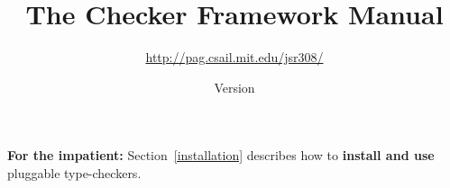 \documentclass[10pt]{article}
\title{The Checker Framework Manual}
\author{%
\url{http://pag.csail.mit.edu/jsr308/}}
\date{Version \ReleaseInfo{}}
\def\codesize{\relax}           %
\newcommand{\code}[1]{\ifmmode{\mbox{\codesize\ttfamily{#1}}}\else{\codesize\ttfamily #1}\fi}
\def\<#1>{\code{#1}}
\newcommand{\htmlhr}{\relax}
\begin{document}
\maketitle


  \let\Itemize =\itemize
  \let\Enumerate =\enumerate
  \let\Description =\description
  \def\Nospacing{\itemsep=0pt\topsep=0pt\partopsep=0pt\parskip=0pt\parsep=0pt}
  \renewenvironment{itemize}{\Itemize\Nospacing}{\endlist}
  \renewenvironment{enumerate}{\Enumerate\Nospacing}{\endlist}
  \renewenvironment{description}{\Description\Nospacing}{\endlist}

  \makeatletter
  \def\topfigrule{\kern3\p@ \hrule \kern -3.4\p@} %
  \def\botfigrule{\kern-3\p@ \hrule \kern 2.6\p@} %
  \def\dblfigrule{\kern3\p@ \hrule \kern -3.4\p@} %
  \makeatother


\newcommand{\refclass}[2]{\ahref{doc/checkers/#1/#2.html}{\<#2>}}
\newcommand{\sunjavadoc}[2]{\ahref{http://java.sun.com/javase/6/docs/api/#1}{\<#2>}}

\noindent
\textbf{For the impatient:}
Section~\ref{installation} describes how to \textbf{install and use} pluggable
type-checkers.

\tableofcontents
\newpage












\htmlhr


\end{document}

